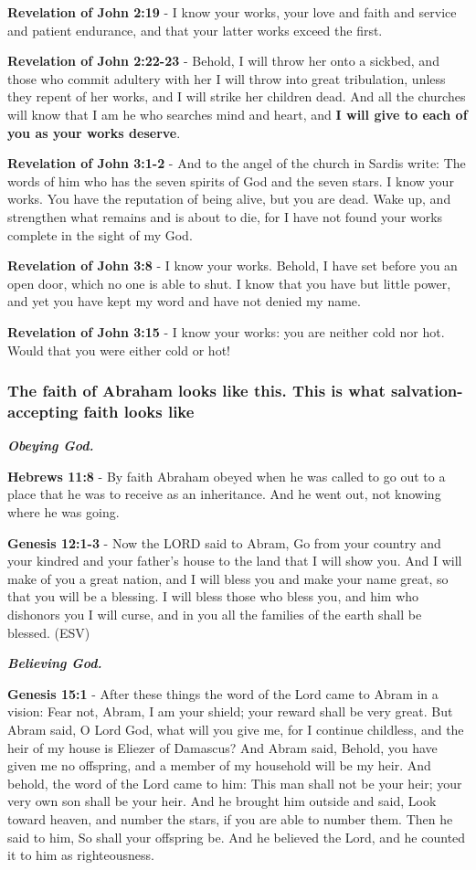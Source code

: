 \documentclass[11pt]{article}
\begin{document}
\textbf{Revelation of John 2:19} - I know your works, your love and faith and service and patient endurance, and that your latter works exceed the first.

\textbf{Revelation of John 2:22-23} - Behold, I will throw her onto a sickbed, and those who commit adultery with her I will throw into great tribulation, unless they repent of her works, and I will strike her children dead. And all the churches will know that I am he who searches mind and heart, and \textbf{I will give to each of you as your works deserve}.

\textbf{Revelation of John 3:1-2} - And to the angel of the church in Sardis write: The words of him who has the seven spirits of God and the seven stars. I know your works. You have the reputation of being alive, but you are dead. Wake up, and strengthen what remains and is about to die, for I have not found your works complete in the sight of my God.

\textbf{Revelation of John 3:8} - I know your works. Behold, I have set before you an open door, which no one is able to shut. I know that you have but little power, and yet you have kept my word and have not denied my name.

\textbf{Revelation of John 3:15} - I know your works: you are neither cold nor hot. Would that you were either cold or hot!

\subsubsection{The faith of Abraham looks like this. This is what salvation-accepting faith looks like}
\label{sec:org0c7f215}

\emph{\textbf{Obeying God.}}

\textbf{Hebrews 11:8} - By faith Abraham obeyed when he was called to go out to a place that he was to receive as an inheritance. And he went out, not knowing where he was going.

\textbf{Genesis 12:1-3} - Now the LORD said to Abram, Go from your country and your kindred and your father's house to the land that I will show you. And I will make of you a great nation, and I will bless you and make your name great, so that you will be a blessing. I will bless those who bless you, and him who dishonors you I will curse, and in you all the families of the earth shall be blessed. (ESV)

\emph{\textbf{Believing God.}}

\textbf{Genesis 15:1} - After these things the word of the Lord came to Abram in a vision: Fear not, Abram, I am your shield; your reward shall be very great. But Abram said, O Lord God, what will you give me, for I continue childless, and the heir of my house is Eliezer of Damascus? And Abram said, Behold, you have given me no offspring, and a member of my household will be my heir. And behold, the word of the Lord came to him: This man shall not be your heir; your very own son shall be your heir. And he brought him outside and said, Look toward heaven, and number the stars, if you are able to number them. Then he said to him, So shall your offspring be. And he believed the Lord, and he counted it to him as righteousness.
\end{document}
